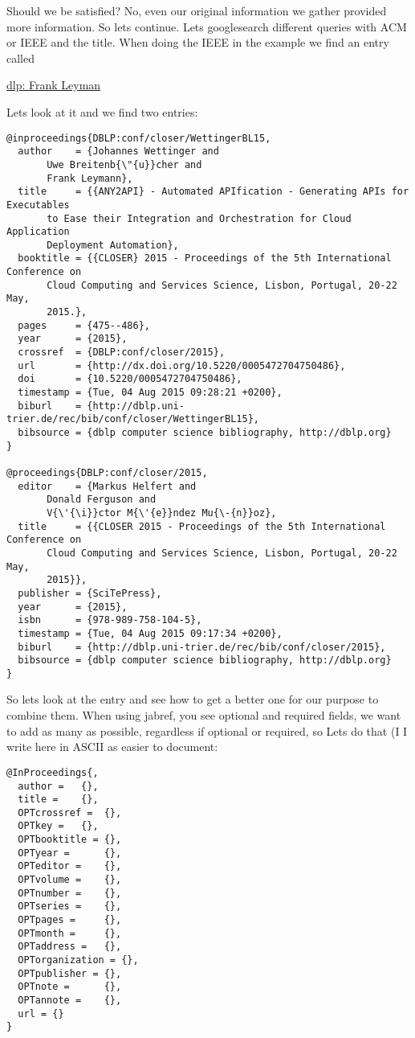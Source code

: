 Should we be satisfied? No, even our original information we gather
provided more information. So lets continue. Lets googlesearch different
queries with ACM or IEEE and the title. When doing the IEEE in the
example we find an entry called

\href{http\%3A\%2F\%2Fdblp.uni-trier.de\%2Fpers\%2Fl\%2FLeymann\%3AFrank\&usg=AFQjCNHCu-66qxWH0zRlPLr4DA8jIo5V-g\&sig2=1vYdnGOEiMcLBEMpbeBA7g}{dlp:
Frank Leyman}

Lets look at it and we find two entries:

\begin{verbatim}
@inproceedings{DBLP:conf/closer/WettingerBL15,
  author    = {Johannes Wettinger and
       Uwe Breitenb{\"{u}}cher and
       Frank Leymann},
  title     = {{ANY2API} - Automated APIfication - Generating APIs for Executables
       to Ease their Integration and Orchestration for Cloud Application
       Deployment Automation},
  booktitle = {{CLOSER} 2015 - Proceedings of the 5th International Conference on
       Cloud Computing and Services Science, Lisbon, Portugal, 20-22 May,
       2015.},
  pages     = {475--486},
  year      = {2015},
  crossref  = {DBLP:conf/closer/2015},
  url       = {http://dx.doi.org/10.5220/0005472704750486},
  doi       = {10.5220/0005472704750486},
  timestamp = {Tue, 04 Aug 2015 09:28:21 +0200},
  biburl    = {http://dblp.uni-trier.de/rec/bib/conf/closer/WettingerBL15},
  bibsource = {dblp computer science bibliography, http://dblp.org}
}

@proceedings{DBLP:conf/closer/2015,
  editor    = {Markus Helfert and
       Donald Ferguson and
       V{\'{\i}}ctor M{\'{e}}ndez Mu{\-{n}}oz},
  title     = {{CLOSER 2015 - Proceedings of the 5th International Conference on
       Cloud Computing and Services Science, Lisbon, Portugal, 20-22 May,
       2015}},
  publisher = {SciTePress},
  year      = {2015},
  isbn      = {978-989-758-104-5},
  timestamp = {Tue, 04 Aug 2015 09:17:34 +0200},
  biburl    = {http://dblp.uni-trier.de/rec/bib/conf/closer/2015},
  bibsource = {dblp computer science bibliography, http://dblp.org}
}
\end{verbatim}

So lets look at the entry and see how to get a better one for our
purpose to combine them. When using jabref, you see optional and
required fields, we want to add as many as possible, regardless if
optional or required, so Lets do that (I I write here in ASCII as easier
to document:

\begin{verbatim}
@InProceedings{,
  author =   {},
  title =    {},
  OPTcrossref =  {},
  OPTkey =   {},
  OPTbooktitle = {},
  OPTyear =      {},
  OPTeditor =    {},
  OPTvolume =    {},
  OPTnumber =    {},
  OPTseries =    {},
  OPTpages =     {},
  OPTmonth =     {},
  OPTaddress =   {},
  OPTorganization = {},
  OPTpublisher = {},
  OPTnote =      {},
  OPTannote =    {},
  url = {}
}
\end{verbatim}

